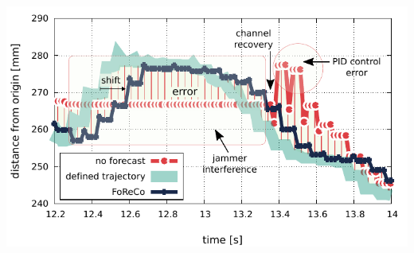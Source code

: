 \documentclass[a0,portrait]{a0poster}
\begin{document}
\begin{multicols}{2}
\begin{center}\vspace{1cm}
    \includegraphics[width=.85\linewidth]{figures/foreco-experim-out-xyz-zoomed.pdf}
    \label{fig:jammer-trajectories}
\end{center}\vspace{1cm}




\color{DarkSlateGray} %



\printbibliography






\end{multicols}
\end{document}
